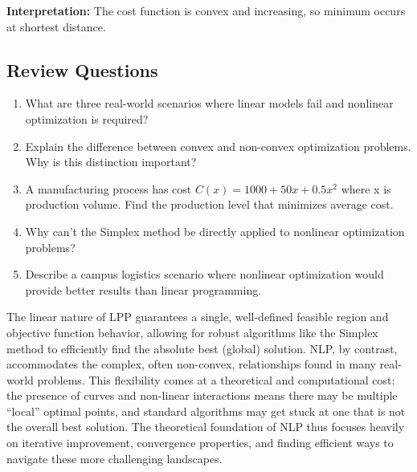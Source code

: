 \documentclass[
  letterpaper,
  DIV=11,
  numbers=noendperiod]{scrreprt}
\begin{document}
\textbf{Interpretation:} The cost function is convex and increasing, so
minimum occurs at shortest distance.

\subsection{Review Questions}\label{review-questions-1}

\begin{enumerate}
\def\labelenumi{\arabic{enumi}.}
\item
  What are three real-world scenarios where linear models fail and
  nonlinear optimization is required?
\item
  Explain the difference between convex and non-convex optimization
  problems. Why is this distinction important?
\item
  A manufacturing process has cost \(C(x) = 1000 + 50x + 0.5x^2\) where
  x is production volume. Find the production level that minimizes
  average cost.
\item
  Why can't the Simplex method be directly applied to nonlinear
  optimization problems?
\item
  Describe a campus logistics scenario where nonlinear optimization
  would provide better results than linear programming.
\end{enumerate}

\begin{tcolorbox}[enhanced jigsaw, leftrule=.75mm, rightrule=.15mm, colback=white, colbacktitle=quarto-callout-note-color!10!white, arc=.35mm, opacityback=0, toptitle=1mm, bottomrule=.15mm, bottomtitle=1mm, titlerule=0mm, title=\textcolor{quarto-callout-note-color}{\faInfo}\hspace{0.5em}{NLP Vs LPP}, toprule=.15mm, left=2mm, coltitle=black, breakable, colframe=quarto-callout-note-color-frame, opacitybacktitle=0.6]

The linear nature of LPP guarantees a single, well-defined feasible
region and objective function behavior, allowing for robust algorithms
like the Simplex method to efficiently find the absolute best (global)
solution. NLP, by contrast, accommodates the complex, often non-convex,
relationships found in many real-world problems. This flexibility comes
at a theoretical and computational cost: the presence of curves and
non-linear interactions means there may be multiple ``local'' optimal
points, and standard algorithms may get stuck at one that is not the
overall best solution. The theoretical foundation of NLP thus focuses
heavily on iterative improvement, convergence properties, and finding
efficient ways to navigate these more challenging landscapes.

\end{tcolorbox}
\end{document}
